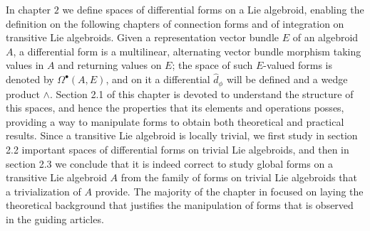 In chapter $2$ we define spaces of differential forms on a Lie algebroid, enabling the definition on the following chapters of connection forms and of integration on transitive Lie algebroids. Given a representation vector bundle $E$ of an algebroid $A$, a differential form is a multilinear, alternating vector bundle morphism taking values in $A$ and returning values on $E$; the space of such $E$-valued forms is denoted by $\Omega^\bullet(A, E)$, and on it a differential $\hat d_\phi$ will be defined and a wedge product $\wedge$. Section 2.1 of this chapter is devoted to understand the structure of this spaces, and hence the properties that its elements and operations posses, providing a way to manipulate forms to obtain both theoretical and practical results. Since a transitive Lie algebroid is locally trivial, we first study in section 2.2 important spaces of differential forms on trivial Lie algebroids, and then in section 2.3 we conclude that it is indeed correct to study global forms on a transitive Lie algebroid $A$ from the family of forms on trivial Lie algebroids that a trivialization of $A$ provide. The majority of the chapter in focused on laying the theoretical background that justifies the manipulation of forms that is observed in the guiding articles.


